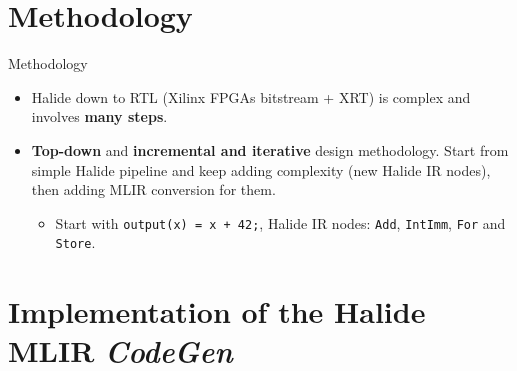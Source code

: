 \documentclass[8pt,a4paper,oneside,hidelinks,aspectratio=169,dvipsnames]{beamer}
\newcommand{\codecpp}[1]{\texttt{#1}}
\begin{document}
\section{Methodology}

\begin{frame}{Methodology}
  \begin{itemize}
    \item Halide down to RTL (Xilinx FPGAs bitstream + XRT) is complex and involves \textbf{many steps}.
    \item \textbf{Top-down} and \textbf{incremental and iterative} design methodology. Start from simple Halide pipeline and keep adding complexity (new Halide IR nodes), then adding MLIR conversion for them.
          \begin{itemize}
            \item Start with \codecpp{output(x) = x + 42;}, Halide IR nodes: \codecpp{Add}, \codecpp{IntImm}, \codecpp{For} and \codecpp{Store}.
          \end{itemize}
  \end{itemize}
  \begin{figure}
    \centering
    \scalebox{.36}{}
  \end{figure}
\end{frame}

\section{Implementation of the Halide MLIR \textit{CodeGen}}
\end{document}
